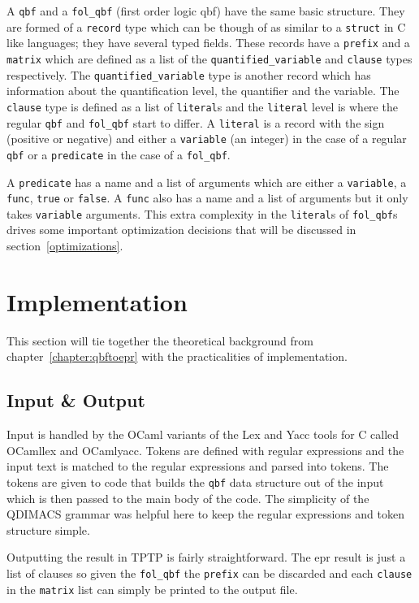 A \texttt{qbf} and a \texttt{fol\_qbf} (first order logic \gls{qbf}) have the same basic structure. They are formed of a \texttt{record} type which can be though of as similar to a \texttt{struct} in C like languages; they have several typed fields. These records have a \texttt{prefix} and a \texttt{matrix} which are defined as a list of the \texttt{quantified\_variable} and \texttt{clause} types respectively. The \texttt{quantified\_variable} type is another record which has information about the quantification level, the quantifier and the variable. The \texttt{clause} type is defined as a list of \texttt{literal}s and the \texttt{literal} level is where the regular \texttt{qbf} and \texttt{fol\_qbf} start to differ. A \texttt{literal} is a record with the sign (positive or negative) and either a \texttt{variable} (an integer) in the case of a regular \texttt{qbf} or a \texttt{predicate} in the case of a \texttt{fol\_qbf}.

A \texttt{predicate} has a name and a list of arguments which are either a \texttt{variable}, a \texttt{func}, \texttt{true} or \texttt{false}. A \texttt{func} also has a name and a list of arguments but it only takes \texttt{variable} arguments. This extra complexity in the \texttt{literal}s of \texttt{fol\_qbf}s drives some important optimization decisions that will be discussed in section~\ref{optimizations}.

\section{Implementation}
This section will tie together the theoretical background from chapter~\ref{chapter:qbftoepr} with the practicalities of implementation.

\subsection{Input \& Output}
Input is handled by the OCaml variants of the Lex and Yacc tools for C called OCamllex and OCamlyacc. Tokens are defined with regular expressions and the input text is matched to the regular expressions and parsed into tokens. The tokens are given to code that builds the \texttt{qbf} data structure out of the input which is then passed to the main body of the code. The simplicity of the QDIMACS grammar was helpful here to keep the regular expressions and token structure simple.

Outputting the result in TPTP is fairly straightforward. The \gls{epr} result is just a list of clauses so given the \texttt{fol\_qbf} the \texttt{prefix} can be discarded and each \texttt{clause} in the \texttt{matrix} list can simply be printed to the output file.

